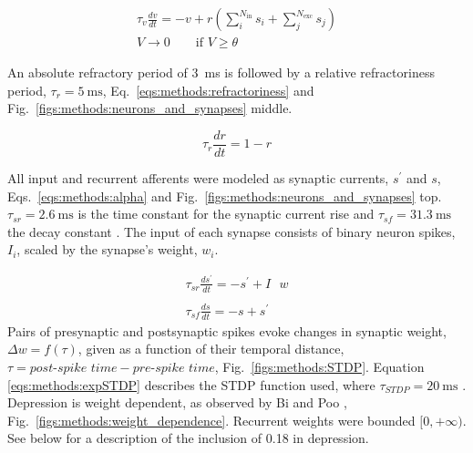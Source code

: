 \documentclass[utf8]{FrontiersinHarvard} %
\begin{document}
\begin{subequations}
    \begin{gather}
        \tau_{v} \frac{dv}{dt}= -v + r ( \sum_{i}^{N_{\mathrm{in}}}{s_{i}} + \sum_{j}^{N_{\mathrm{exc}}}{s_{j}} ) \\
        V \rightarrow 0 \qquad \mbox{if } V \geq \theta
    \end{gather}
    \label{eqs:methods:LIF}
\end{subequations}

An absolute refractory period of \SI{3}{\milli\second} is followed by a relative refractoriness period, $\tau_{r}=\SI{5}{\milli\second}$, Eq.~\ref{eqs:methods:refractoriness} and Fig.~\ref{figs:methods:neurons_and_synapses} middle.

\begin{equation}
    \tau_{r} \frac{dr}{dt}= 1-r
    \label{eqs:methods:refractoriness}
\end{equation}

All input and recurrent afferents were modeled as synaptic currents, $s^{\prime}$ and $s$, Eqs.~\ref{eqs:methods:alpha} and Fig.~\ref{figs:methods:neurons_and_synapses} top. $\tau_{sr}=\SI{2.6}{\milli\second}$ is the time constant for the synaptic current rise and $\tau_{sf}=\SI{31.3}{\milli\second}$ the decay constant \citep{Hunt.2022}. The input of each synapse consists of binary neuron spikes, $I_{i}$, scaled by the synapse's weight, $w_{i}$.

\begin{subequations}
    \begin{gather}
        \tau_{sr} \frac{ds^{\prime}}{dt}= -s^{\prime} + I \text{ } w \\
        \nonumber \\
        \tau_{sf} \frac{ds}{dt}= -s+s^{\prime}
    \end{gather}
    \label{eqs:methods:alpha}
\end{subequations}
%
Pairs of presynaptic and postsynaptic spikes evoke changes in synaptic weight, $\Delta w=f(\tau)$, given as a function of their temporal distance, $\tau=\textit{post-spike time}-\textit{pre-spike time}$, Fig.~\ref{figs:methods:STDP}. Equation \ref{eqs:methods:expSTDP} describes the STDP function used,  where $\tau_{STDP}=\SI{20}{\milli\second}$ \citep{Bi.1998}. Depression is weight dependent, as observed by Bi and Poo \citeyearpar{Bi.1998}, Fig.~\ref{figs:methods:weight_dependence}. Recurrent weights were bounded $[0, +\infty)$. See below for a description of the inclusion of \SI{0.18}{} in depression.
\end{document}
